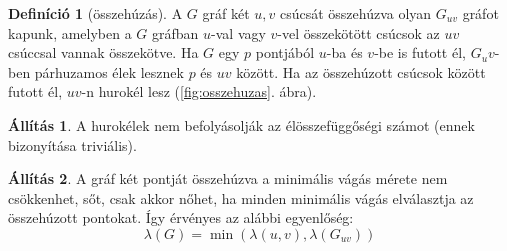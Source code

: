 \documentclass{article}
\theoremstyle{definition}
\newtheorem*{definicio}{Definíció}
\newtheorem*{allitas}{Állítás}
\begin{document}
\begin{definicio}[összehúzás] A $G$ gráf két $u, v$ csúcsát összehúzva olyan $G_{uv}$ gráfot kapunk, amelyben a $G$ gráfban $u$-val vagy $v$-vel összekötött csúcsok az $uv$ csúccsal vannak összekötve. Ha $G$ egy $p$ pontjából $u$-ba és $v$-be is futott él, $G_uv$-ben párhuzamos élek lesznek $p$ és $uv$ között. Ha az összehúzott csúcsok között futott él, $uv$-n hurokél lesz (\ref{fig:osszehuzas}. ábra).
\end{definicio}

\begin{allitas}
A hurokélek nem befolyásolják az élösszefüggőségi számot (ennek bizonyítása triviális).
\end{allitas}

\begin{allitas}
A gráf két pontját összehúzva a minimális vágás mérete nem csökkenhet, sőt, csak akkor nőhet, ha minden minimális vágás elválasztja az összehúzott pontokat. Így érvényes az alábbi egyenlőség:
\[ \lambda(G) = \min(\lambda(u, v), \lambda(G_{uv})) \]
\end{allitas}
\end{document}
